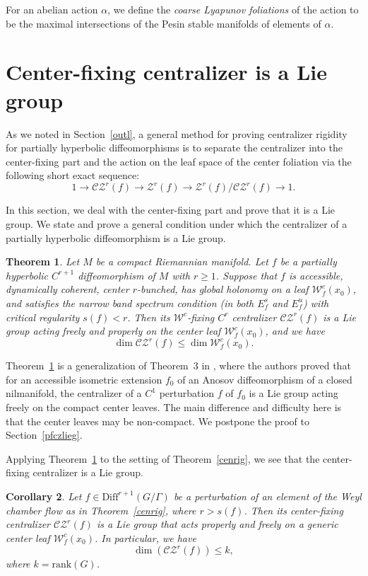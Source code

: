 \documentclass[11pt]{amsart}
\numberwithin{equation}{section}
\newcommand{\W}{\mathcal{W}}
\newcommand{\CZ}{\mathcal{CZ}}
\theoremstyle{plain}
\newtheorem{thm}{Theorem}[section]
\newtheorem{cor}[thm]{Corollary}
\begin{document}
For an abelian action $\alpha$, we define the \emph{coarse Lyapunov foliations} of the action to be the maximal intersections of the Pesin stable manifolds of elements of $\alpha$.

\section{Center-fixing centralizer is a Lie group}\label{cenfix}

As we noted in Section~\ref{outl}, a general method for proving centralizer rigidity for partially hyperbolic diffeomorphisms is to separate the centralizer into the center-fixing part and the action on the leaf space of the center foliation via the following short exact sequence:
\[
1\to \CZ^r(f)\to \mathcal{Z}^r(f)\to \mathcal{Z}^r(f)/\CZ^r(f)\to 1.
\]

In this section, we deal with the center-fixing part and prove that it is a Lie group. We state and prove a general condition under which the centralizer of a partially hyperbolic diffeomorphism is a Lie group.

\begin{thm}\label{czlieg}
Let $M$ be a compact Riemannian manifold. Let $f$ be a partially hyperbolic $C^{r+1}$ diffeomorphism of $M$ with $r\ge 1$. Suppose that $f$ is accessible, dynamically coherent, center $r$-bunched, has global holonomy on a leaf $\W^c_f(x_0)$, and satisfies the narrow band spectrum condition (in both $E^s_f$ and $E^u_f$) with critical regularity $s(f)<r$. Then its $\W^c$-fixing $C^r$ centralizer $\CZ^r(f)$ is a Lie group acting freely and properly on the center leaf $\W^c_f(x_0)$, and we have
\[
\dim \CZ^r(f)\le \dim \W^c_f(x_0).
\]
\end{thm}

Theorem~\ref{czlieg} is a generalization of Theorem~3 in \cite{DWX23}, where the authors proved that for an accessible isometric extension $f_0$ of an Anosov diffeomorphism of a closed nilmanifold, the centralizer of a $C^1$ perturbation $f$ of $f_0$ is a Lie group acting freely on the compact center leaves. The main difference and difficulty here is that the center leaves may be non-compact. We postpone the proof to Section~\ref{pfczlieg}.

Applying Theorem~\ref{czlieg} to the setting of Theorem~\ref{cenrig}, we see that the center-fixing centralizer is a Lie group.

\begin{cor}
Let $f\in \mathrm{Diff}^{r+1}(G/\Gamma)$ be a perturbation of an element of the Weyl chamber flow as in Theorem~\ref{cenrig}, where $r> s(f)$. Then its center-fixing centralizer $\CZ^r(f)$ is a Lie group that acts properly and freely on a generic center leaf $\W^c_f(x_0)$. In particular, we have
\[
\dim(\CZ^r(f))\le k,
\]
where $k=\mathrm{rank}(G)$.
\end{cor}
\end{document}
